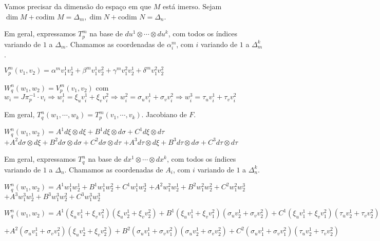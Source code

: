 \documentclass[10pt,a4paper]{article}
\begin{document}
		Vamos precisar da dimens\~ao do espa\c{c}o em que $M$ est\'a imerso. Sejam $\dim M + \text{codim } M = \Delta_m, \dim N + \text{codim } N = \Delta_n$.

		Em geral, expressamos $T_p^m$ na base de $du^1 \otimes \cdots \otimes du^k$, com todos os \'indices variando de $1$ a $\Delta_m$. Chamamos as coordenadas de $\alpha_i^m$, com $i$ variando de $1$ a $\Delta_m^k$.

		\vspace{3mm}

		$V_p^m(v_1, v_2) = \alpha^m v_1^1 v_2^1 + \beta^m v_1^1 v_2^2 + \gamma^m v_1^2 v_2^1 + \delta^m v_1^2 v_2^2$

		$W_q^n(w_1, w_2) = V_p^m(v_1, v_2)$ com $w_i = J\pi^{-1}_p \cdot v_i \Rightarrow w_i^1 = \xi_u v_i^1 + \xi_v v_i^2 \Rightarrow w_i^2 = \sigma_u v_i^1 + \sigma_v v_i^2 \Rightarrow w_i^3 = \tau_u v_i^1 + \tau_v v_i^2$

		Em geral, $T_q^n(w_1,\cdots,w_k) = T_p^m(v_1, \cdots, v_k)$. Jacobiano de $F$.

		\vspace{3mm}

		$W_q^n(w_1, w_2) = A^1 d\xi \otimes d\xi + B^1 d\xi \otimes d\sigma + C^1 d\xi \otimes d\tau $
		$+ A^2 d\sigma \otimes d\xi + B^2 d\sigma \otimes d\sigma + C^2 d\sigma \otimes d\tau $
		$+ A^3 d\tau \otimes d\xi + B^3 d\tau \otimes d\sigma + C^3 d\tau \otimes d\tau $

		Em geral, expressamos $T_q^n$ na base de $dx^1 \otimes \cdots \otimes dx^k$, com todos os \'indices variando de $1$ a $\Delta_n$. Chamamos as coordenadas de $A_i$, com $i$ variando de $1$ a $\Delta_n^k$.

		\vspace{3mm}

		$W_q^n(w_1, w_2) = A^1 w^1_1 w^1_2 + B^1 w^1_1 w^2_2 + C^1 w^1_1 w^3_2 $
		$+ A^2 w^2_1 w^1_2 + B^2 w^2_1 w^2_2 + C^2 w^2_1 w^3_2 $
		$+ A^3 w^3_1 w^1_2 + B^3 w^3_1 w^2_2 + C^3 w^3_1 w^3_2 $

		\vspace{3mm}

		$W_q^n(w_1, w_2) = A^1 (\xi_u v^1_1 + \xi_v v^2_1) (\xi_u v^1_2 + \xi_v v^2_2) + B^1 (\xi_u v^1_1 + \xi_v v^2_1) (\sigma_u v^1_2 + \sigma_v v^2_2) + C^1 (\xi_u v^1_1 + \xi_v v^2_1) (\tau_u v^1_2 + \tau_v v^2_2) $

		$+ A^2 (\sigma_u v^1_1 + \sigma_v v^2_1) (\xi_u v^1_2 + \xi_v v^2_2) + B^2 (\sigma_u v^1_1 + \sigma_v v^2_1) (\sigma_u v^1_2 + \sigma_v v^2_2) + C^2 (\sigma_u v^1_1 + \sigma_v v^2_1) (\tau_u v^1_2 + \tau_v v^2_2) $
\end{document}
